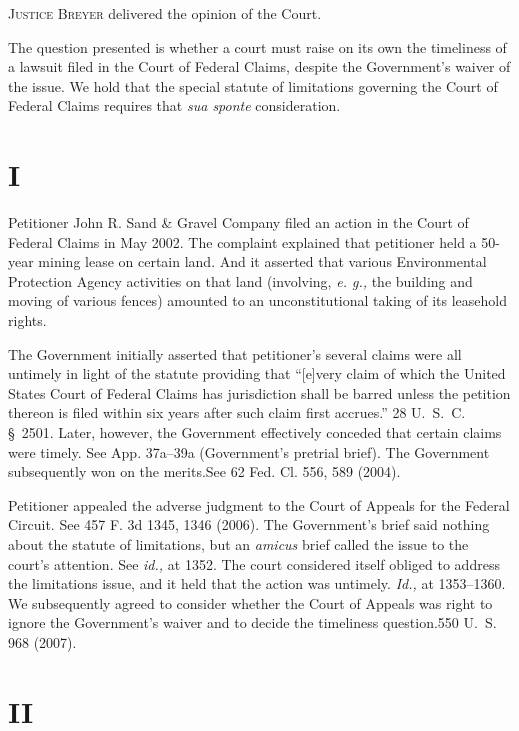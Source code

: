 
\setcounter{page}{132}

  \textsc{Justice Breyer} delivered the opinion of the Court.

  The question presented is whether a court must raise on its own the timeliness of a lawsuit filed in the Court of Federal Claims, despite the Government's waiver of the issue. We hold that the special statute of limitations governing the Court of Federal Claims requires that \emph{sua sponte} consideration.

\section{I}

  Petitioner John R. Sand \& Gravel Company filed an action in the Court of Federal Claims in May 2002. The complaint explained that petitioner held a 50-year mining lease on certain land. And it asserted that various Environmental Protection Agency activities on that land (involving, \emph{e. g.,} the building and moving of various fences) amounted to an unconstitutional taking of its leasehold rights.

  The Government initially asserted that petitioner's several claims were all untimely in light of the statute providing that ``[e]very claim of which the United States Court of Federal Claims has jurisdiction shall be barred unless the petition thereon is filed within six years after such claim first accrues.'' 28 U.~S.~C. \S~2501. Later, however, the Government effectively conceded that certain claims were timely. See App. 37a--39a (Government's pretrial brief). The Government subsequently won on the merits.See 62 Fed. Cl. 556, 589 (2004).\newpage 

  Petitioner appealed the adverse judgment to the Court of Appeals for the Federal Circuit. See 457 F. 3d 1345, 1346 (2006). The Government's brief said nothing about the statute of limitations, but an \emph{amicus} brief called the issue to the court's attention. See \emph{id.,} at 1352. The court considered itself obliged to address the limitations issue, and it held that the action was untimely. \emph{Id.,} at 1353--1360. We subsequently agreed to consider whether the Court of Appeals was right to ignore the Government's waiver and to decide the timeliness question.550 U.~S. 968 (2007).

\section{II}

